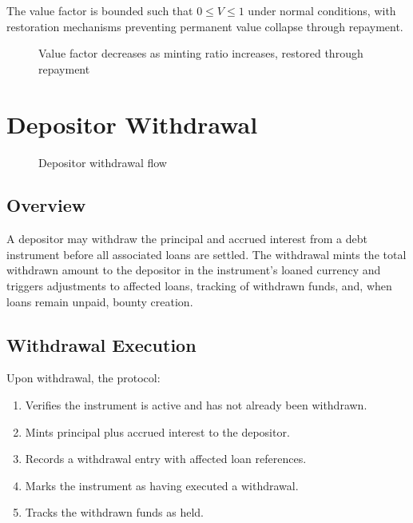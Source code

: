 \documentclass[11pt,a4paper]{article}
\begin{document}
The value factor is bounded such that $0 \leq V \leq 1$ under normal conditions, with restoration mechanisms preventing permanent value collapse through repayment.

\begin{figure}[H]
\centering
{}
\caption{Value factor decreases as minting ratio increases, restored through repayment}
\label{fig:valuefactor}
\end{figure}

\section{Depositor Withdrawal}
\begin{figure}[H]
\centering
{}
\caption{Depositor withdrawal flow}
\label{fig:withdraw}
\end{figure}

\subsection{Overview}
A depositor may withdraw the principal and accrued interest from a debt instrument before all associated loans are settled. The withdrawal mints the total withdrawn amount to the depositor in the instrument's loaned currency and triggers adjustments to affected loans, tracking of withdrawn funds, and, when loans remain unpaid, bounty creation.

\subsection{Withdrawal Execution}
Upon withdrawal, the protocol:
\begin{enumerate}
\item Verifies the instrument is active and has not already been withdrawn.
\item Mints principal plus accrued interest to the depositor.
\item Records a withdrawal entry with affected loan references.
\item Marks the instrument as having executed a withdrawal.
\item Tracks the withdrawn funds as held.
\end{enumerate}
\end{document}
